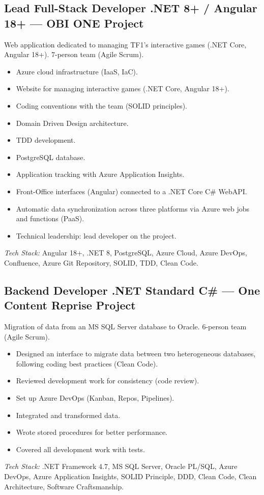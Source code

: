 \documentclass[10pt,a4paper]{article}
\begin{document}
\subsection*{Lead Full-Stack Developer .NET 8+ / Angular 18+ --- OBI ONE Project}
\color{darkgray}
Web application dedicated to managing TF1's interactive games (.NET Core, Angular 18+). 7-person team (Agile Scrum).
\begin{itemize}
  \item Azure cloud infrastructure (IaaS, IaC).
  \item Website for managing interactive games (.NET Core, Angular 18+).
  \item Coding conventions with the team (SOLID principles).
  \item Domain Driven Design architecture.
  \item TDD development.
  \item PostgreSQL database.
  \item Application tracking with Azure Application Insights.
  \item Front-Office interfaces (Angular) connected to a .NET Core C\# WebAPI.
  \item Automatic data synchronization across three platforms via Azure web jobs and functions (PaaS).
  \item Technical leadership: lead developer on the project.
\end{itemize}
\textit{Tech Stack:} Angular 18+, .NET 8, PostgreSQL, Azure Cloud, Azure DevOps, Confluence, Azure Git Repository, SOLID, TDD, Clean Code.

\vspace{6pt}

\subsection*{Backend Developer .NET Standard C\# --- One Content Reprise Project}
\color{darkgray}
Migration of data from an MS SQL Server database to Oracle. 6-person team (Agile Scrum).
\begin{itemize}
  \item Designed an interface to migrate data between two heterogeneous databases, following coding best practices (Clean Code).
  \item Reviewed development work for consistency (code review).
  \item Set up Azure DevOps (Kanban, Repos, Pipelines).
  \item Integrated and transformed data.
  \item Wrote stored procedures for better performance.
  \item Covered all development work with tests.
\end{itemize}
\textit{Tech Stack:} .NET Framework 4.7, MS SQL Server, Oracle PL/SQL, Azure DevOps, Azure Application Insights, SOLID Principle, DDD, Clean Code, Clean Architecture, Software Craftsmanship.
\end{document}
